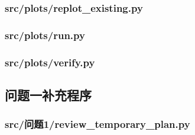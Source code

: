 \documentclass[zihao=-4,a4paper,UTF8,fontset=none]{ctexart}
\begin{document}
\subsubsection*{src/plots/replot\_existing.py}


\subsubsection*{src/plots/run.py}


\subsubsection*{src/plots/verify.py}


\subsection{问题一补充程序}
\subsubsection*{src/问题1/review\_temporary\_plan.py}

\end{document}
